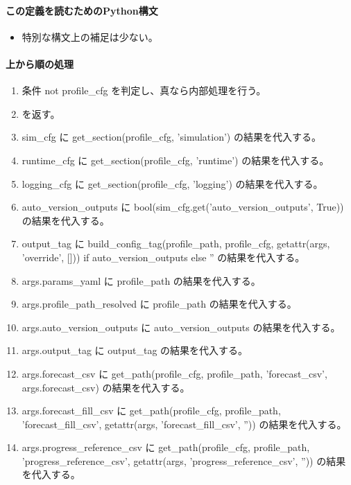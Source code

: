 \documentclass[a4paper,11pt]{article}
\begin{document}
            \paragraph{この定義を読むためのPython構文}
            \begin{itemize}[leftmargin=1.6em]
            \item 特別な構文上の補足は少ない。
            \end{itemize}
            \paragraph{上から順の処理}
            \begin{enumerate}[leftmargin=1.8em]
            \item 条件 not profile\_cfg を判定し、真なら内部処理を行う。
\item    を返す。
\item sim\_cfg に get\_section(profile\_cfg, 'simulation') の結果を代入する。
\item runtime\_cfg に get\_section(profile\_cfg, 'runtime') の結果を代入する。
\item logging\_cfg に get\_section(profile\_cfg, 'logging') の結果を代入する。
\item auto\_version\_outputs に bool(sim\_cfg.get('auto\_version\_outputs', True)) の結果を代入する。
\item output\_tag に build\_config\_tag(profile\_path, profile\_cfg, getattr(args, 'override', [])) if auto\_version\_outputs else '' の結果を代入する。
\item args.params\_yaml に profile\_path の結果を代入する。
\item args.profile\_path\_resolved に profile\_path の結果を代入する。
\item args.auto\_version\_outputs に auto\_version\_outputs の結果を代入する。
\item args.output\_tag に output\_tag の結果を代入する。
\item args.forecast\_csv に get\_path(profile\_cfg, profile\_path, 'forecast\_csv', args.forecast\_csv) の結果を代入する。
\item args.forecast\_fill\_csv に get\_path(profile\_cfg, profile\_path, 'forecast\_fill\_csv', getattr(args, 'forecast\_fill\_csv', '')) の結果を代入する。
\item args.progress\_reference\_csv に get\_path(profile\_cfg, profile\_path, 'progress\_reference\_csv', getattr(args, 'progress\_reference\_csv', '')) の結果を代入する。

\end{enumerate}
\end{document}
